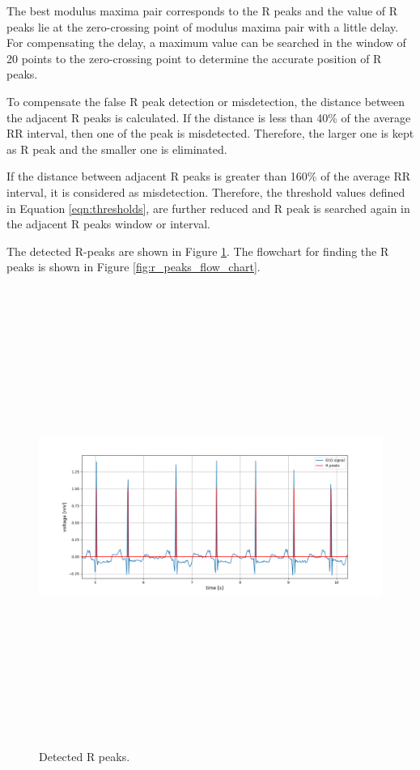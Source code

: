 The best modulus maxima pair corresponds to the R peaks and the value of R peaks lie at the zero-crossing point of modulus maxima pair with a little delay. For compensating the delay, a maximum value can be searched in the window of 20 points to the zero-crossing point to determine the accurate position of R peaks. 

To compensate the false R peak detection or misdetection, the distance between the adjacent R peaks is calculated. If the distance is less than 40\% of the average RR interval, then one of the peak is misdetected. Therefore, the larger one is kept as R peak and the smaller one is eliminated.

If the distance between adjacent R peaks is greater than 160\% of the average RR interval, it is considered as misdetection. Therefore, the threshold values defined in Equation \ref{eqn:thresholds}, are further reduced and R peak is searched again in the adjacent R peaks window or interval.


The detected R-peaks are shown in Figure \ref{fig:r_peaks}. The flowchart for finding the R peaks is shown in Figure \ref{fig:r_peaks_flow_chart}.

\begin{figure}[htpb]
	\centering
	\includegraphics[width=15cm,height=15cm,keepaspectratio=true]{images/r_peaks}
	\caption{
		Detected R peaks.
	}
	\label{fig:r_peaks}
\end{figure}


